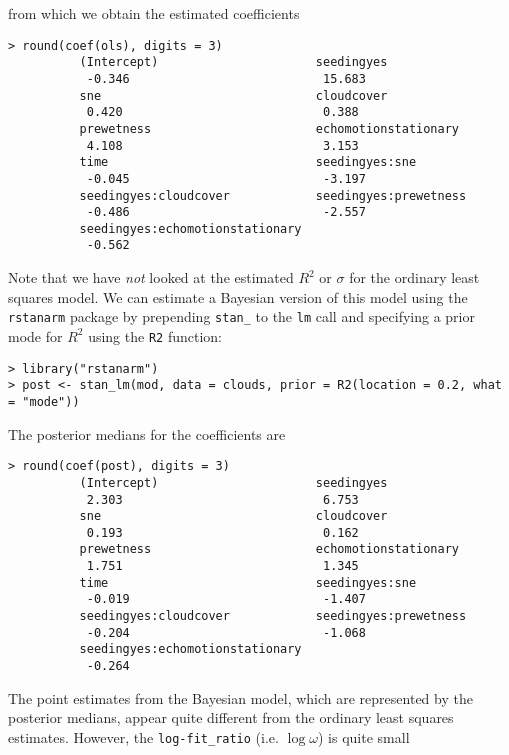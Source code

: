 \documentclass[11pt]{article}
\begin{document}
from which we obtain the estimated coefficients

\begin{lstlisting}
> round(coef(ols), digits = 3)
          (Intercept)                      seedingyes
           -0.346                           15.683
          sne                              cloudcover
           0.420                            0.388
          prewetness                       echomotionstationary
           4.108                            3.153
          time                             seedingyes:sne
           -0.045                           -3.197
          seedingyes:cloudcover            seedingyes:prewetness
           -0.486                           -2.557
          seedingyes:echomotionstationary
           -0.562
\end{lstlisting}

Note that we have \emph{not} looked at the estimated $R^2$ or $\sigma$ for the
ordinary least squares model. We can estimate a Bayesian version of this model
using the {\tt rstanarm} package by prepending {\tt stan\_} to the {\tt lm}
call and specifying a prior mode for $R^2$ using the {\tt R2} function:

\begin{lstlisting}
> library("rstanarm")
> post <- stan_lm(mod, data = clouds, prior = R2(location = 0.2, what = "mode"))
\end{lstlisting}

The posterior medians for the coefficients are

\begin{lstlisting}
> round(coef(post), digits = 3)
          (Intercept)                      seedingyes
           2.303                            6.753
          sne                              cloudcover
           0.193                            0.162
          prewetness                       echomotionstationary
           1.751                            1.345
          time                             seedingyes:sne
           -0.019                           -1.407
          seedingyes:cloudcover            seedingyes:prewetness
           -0.204                           -1.068
          seedingyes:echomotionstationary
           -0.264
\end{lstlisting}


The point estimates from the Bayesian model, which are represented by the
posterior medians, appear quite different from the ordinary least squares
estimates. However, the {\tt log-fit\_ratio} (i.e. $\log{\omega}$) is
quite small
\end{document}
